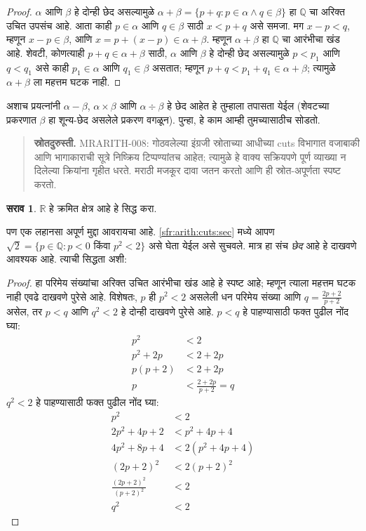 \documentclass[11pt,a4paper,openany]{book}
\theoremstyle{definition}
\newtheorem{prob}{सराव}[chapter]
\newcommand{\Setabs}[2]{\{#1:#2\}}
\newcommand{\Rat}{\mathbb{Q}}
\newcommand{\Real}{\mathbb{R}}
\begin{document}
\begin{proof}
$\alpha$ आणि $\beta$ हे दोन्ही छेद असल्यामुळे $\alpha + \beta = \Setabs{p
+ q}{p \in \alpha \land q \in \beta}$ हा $\Rat$ चा अरिक्त उचित उपसंच
आहे. आता काही $p \in \alpha$ आणि $q \in \beta$ साठी $x < p + q$ असे
समजा. मग $x - p < q$, म्हणून $x - p \in \beta$, आणि $x = p + (x - p)
\in \alpha + \beta$. म्हणून $\alpha + \beta$ हा $\Rat$ चा आरंभीचा खंड
आहे. शेवटी, कोणत्याही $p + q \in \alpha + \beta$ साठी, $\alpha$ आणि
$\beta$ हे दोन्ही छेद असल्यामुळे $p < p_1$ आणि $q < q_1$ असे काही
$p_1 \in \alpha$ आणि $q_1 \in \beta$ असतात; म्हणून $p + q < p_1 + q_1
\in \alpha + \beta$; त्यामुळे $\alpha + \beta$ ला महत्तम घटक नाही.
\end{proof}

अशाच प्रयत्नांनी $\alpha - \beta$, $\alpha \times \beta$ आणि $\alpha
\div \beta$ हे छेद आहेत हे तुम्हाला तपासता येईल (शेवटच्या प्रकरणात
$\beta$ हा शून्य-छेद असलेले प्रकरण वगळून). पुन्हा, हे काम आम्ही
तुमच्यासाठीच सोडतो.
\begin{quote}\small\textbf{स्रोतदुरुस्ती.} MRARITH-008: गोठवलेल्या इंग्रजी स्रोताच्या आधीच्या cuts विभागात वजाबाकी आणि भागाकाराची सूत्रे निष्क्रिय टिप्पण्यांतच आहेत; त्यामुळे हे वाक्य सक्रियपणे पूर्ण व्याख्या न दिलेल्या क्रियांना गृहीत धरते. मराठी मजकूर दावा जतन करतो आणि ही स्रोत-अपूर्णता स्पष्ट करतो.\end{quote}

\begin{prob}
$\Real$ हे क्रमित क्षेत्र आहे हे सिद्ध करा.
\end{prob}

पण एक लहानसा अपूर्ण मुद्दा आवरायचा आहे. \ref{sfr:arith:cuts:sec} मध्ये आपण
$\sqrt{2} = \Setabs{p \in \Rat}{p < 0 \text{ किंवा }p^2 < 2}$ असे घेता
येईल असे सुचवले. मात्र हा संच \emph{छेद} आहे हे दाखवणे आवश्यक आहे.
त्याची सिद्धता अशी:

\begin{proof}
हा परिमेय संख्यांचा अरिक्त उचित आरंभीचा खंड आहे हे स्पष्ट आहे; म्हणून
त्याला महत्तम घटक नाही एवढे दाखवणे पुरेसे आहे. विशेषतः, $p$ ही $p^2 < 2$
असलेली धन परिमेय संख्या आणि $q = \frac{2p+2}{p+2}$ असेल, तर $p < q$
आणि $q^2 < 2$ हे दोन्ही दाखवणे पुरेसे आहे. $p < q$ हे पाहण्यासाठी फक्त
पुढील नोंद घ्या:
\begin{align*}
	p^2 &< 2\\
	p^2 + 2p &< 2 + 2p\\
	p(p + 2) &< 2 + 2p\\
	p &< \tfrac{2+2p}{p+2} = q
\end{align*}
$q^2 < 2$ हे पाहण्यासाठी फक्त पुढील नोंद घ्या:
\begin{align*}
	p^2 &< 2\\
	2p^2 + 4p + 2 &< p^2 + 4p+ 4\\
	4p^2 + 8p + 4 &< 2(p^2 + 4p + 4)\\
	(2p+2)^2 & <2(p+2)^2\\
	\tfrac{(2p+2)^2}{(p+2)^2} &< 2\\
	q^2 &< 2
\end{align*}
\end{proof}
\end{document}
